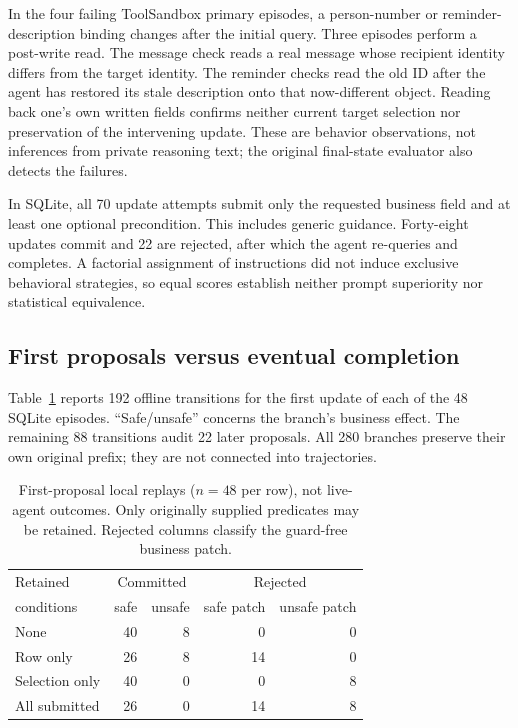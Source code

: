 \documentclass[10pt,letterpaper]{article}
\begin{document}
In the four failing ToolSandbox primary episodes, a person-number or reminder-description binding changes after the initial query. Three episodes perform a post-write read. The message check reads a real message whose recipient identity differs from the target identity. The reminder checks read the old ID after the agent has restored its stale description onto that now-different object. Reading back one's own written fields confirms neither current target selection nor preservation of the intervening update. These are behavior observations, not inferences from private reasoning text; the original final-state evaluator also detects the failures.

In SQLite, all 70 update attempts submit only the requested business field and at least one optional precondition. This includes generic guidance. Forty-eight updates commit and 22 are rejected, after which the agent re-queries and completes. A factorial assignment of instructions did not induce exclusive behavioral strategies, so equal scores establish neither prompt superiority nor statistical equivalence.

\subsection{First proposals versus eventual completion}
Table~\ref{tab:first} reports 192 offline transitions for the first update of each of the 48 SQLite episodes. ``Safe/unsafe'' concerns the branch's business effect. The remaining 88 transitions audit 22 later proposals. All 280 branches preserve their own original prefix; they are not connected into trajectories.

\begin{table}[t]
\centering
\caption{First-proposal local replays ($n=48$ per row), not live-agent outcomes. Only originally supplied predicates may be retained. Rejected columns classify the guard-free business patch.}
\label{tab:first}
\small
\begin{tabular}{@{}lrrrr@{}}\toprule
Retained & \multicolumn{2}{c}{Committed} & \multicolumn{2}{c}{Rejected}\\
conditions & safe & unsafe & safe patch & unsafe patch\\\midrule
None & 40 & 8 & 0 & 0\\
Row only & 26 & 8 & 14 & 0\\
Selection only & 40 & 0 & 0 & 8\\
All submitted & 26 & 0 & 14 & 8\\\bottomrule
\end{tabular}
\end{table}
\end{document}
